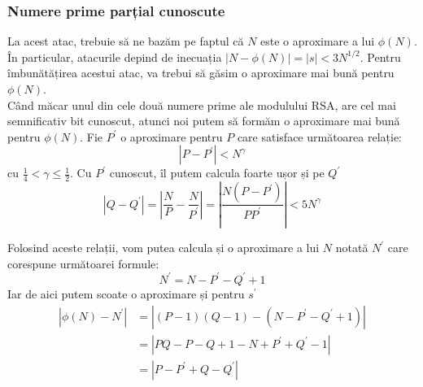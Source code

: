 \documentclass[12pt, oneside]{book}
\begin{document}
\subsubsection{Numere prime parțial cunoscute}
La acest atac, trebuie să ne bazăm pe faptul că $N$ este o aproximare a lui $\phi(N)$. În particular, atacurile depind de inecuația $ | N-\phi(N)|=|s| < 3N^{1/2}$. Pentru îmbunătățirea acestui atac, va trebui să găsim o aproximare mai bună pentru $\phi(N)$. \\
Când măcar unul din cele două numere prime ale modulului RSA, are cel mai semnificativ bit cunoscut, atunci noi putem să formăm o aproximare mai bună pentru $\phi(N)$. Fie $P^{'}$ o aproximare pentru $P$ care satisface următoarea relație:
$$ |P - P^{'}| < N^{\gamma} $$
cu $ \frac{1}{4} < \gamma \leq \frac{1}{2} $. Cu $P^{'} $ cunoscut, îl putem calcula foarte ușor și pe $ Q^{'} $
$$ |Q - Q^{'} | = \left| \frac{N}{P} - \frac{N}{P^{'}} \right| = \left|\frac{N(P-P^{'})}{PP^{'}}\right| < 5 N^{\gamma} $$ 

Folosind aceste relații, vom putea calcula și o aproximare a lui $N$ notată $N^{'}$ care corespune următoarei formule:
$$ N^{'}= N-P^{'} - Q^{'} +1 $$
Iar de aici putem scoate o aproximare și pentru $s^{'}$
\begin{align*}
 \left| \phi(N) - N^{'} \right| &= \left| (P-1)(Q-1) - (N-P^{'} - Q^{'} +1) \right| \\
 &= \left|PQ - P - Q + 1 - N + P^{'} + Q^{'} -1 \right| \\
&=\left|P-P^{'} + Q - Q^{'}\right| 
\end{align*}
\end{document}
